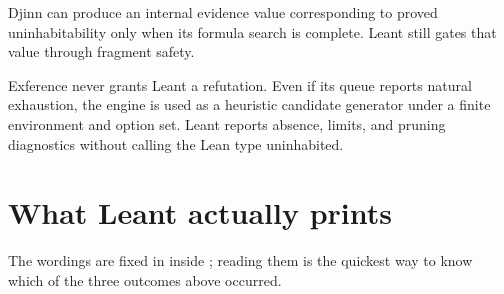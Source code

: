 \documentclass[10pt,letterpaper,oneside,openany]{report}
\newcommand{\term}[1]{\texttt{\detokenize{#1}}}
\begin{document}
Djinn can produce an internal evidence value corresponding to proved uninhabitability only when its formula search is complete.  Leant still gates that value through fragment safety.

Exference never grants Leant a refutation.  Even if its queue reports natural exhaustion, the engine is used as a heuristic candidate generator under a finite environment and option set.  Leant reports absence, limits, and pruning diagnostics without calling the Lean type uninhabited.

\section{What Leant actually prints}

The wordings are fixed in \term{report} inside ; reading them is the quickest way to know which of the three outcomes above occurred.
\end{document}
